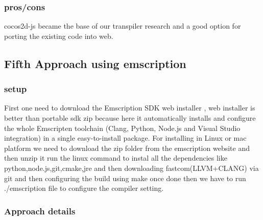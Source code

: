 \documentclass[23pt]{article}
\begin{document}
\subsubsection{pros/cons}

{\Large cocos2d-js became the base of our transpiler research and a good option for porting the existing code into web.  \par}


\subsection{Fifth Approach using emscription}

\subsubsection{setup}

{\Large First one need to download the Emscription SDK web installer , web installer is better than portable sdk zip because here it automatically installs and configure the whole Emscripten toolchain (Clang, Python, Node.js and Visual Studio integration) in a single easy-to-install package. For installing in Linux or mac platform we need to download the zip folder from the emscription website and then unzip it run the linux command to instal all the dependencies like python,node.js,git,cmake,jre and then downloading fastcom(LLVM+CLANG) via git and then configuring the build using make once done then we have to run ./emscription file to configure the compiler setting. \par}


\subsubsection{Approach details}
\end{document}

